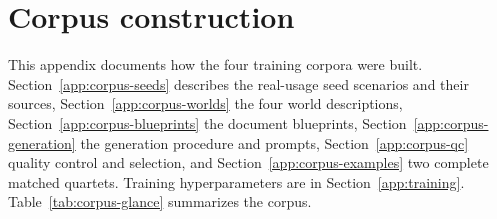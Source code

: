 \documentclass{article} %
\begin{document}








\appendix
{}
\clearpage
{\renewcommand{\contentsname}{Appendix Contents}\tableofcontents}


\section{Corpus construction}
\label{app:corpus}

This appendix documents how the four training corpora were built. Section~\ref{app:corpus-seeds} describes the real-usage seed scenarios and their sources, Section~\ref{app:corpus-worlds} the four world descriptions, Section~\ref{app:corpus-blueprints} the document blueprints, Section~\ref{app:corpus-generation} the generation procedure and prompts, Section~\ref{app:corpus-qc} quality control and selection, and Section~\ref{app:corpus-examples} two complete matched quartets. Training hyperparameters are in Section~\ref{app:training}. Table~\ref{tab:corpus-glance} summarizes the corpus.
\end{document}
